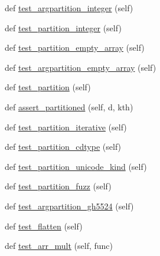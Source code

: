 \begin{DoxyCompactItemize}
\item 
def \hyperlink{classnumpy_1_1core_1_1tests_1_1test__multiarray_1_1TestMethods_aa68bb68efde92f1482c2d26bc1e85b8b}{test\+\_\+argpartition\+\_\+integer} (self)
\item 
def \hyperlink{classnumpy_1_1core_1_1tests_1_1test__multiarray_1_1TestMethods_a37b8921deb447074e1dec9799ff34883}{test\+\_\+partition\+\_\+integer} (self)
\item 
def \hyperlink{classnumpy_1_1core_1_1tests_1_1test__multiarray_1_1TestMethods_ad50732db5971f760aeb95fe0c21c85db}{test\+\_\+partition\+\_\+empty\+\_\+array} (self)
\item 
def \hyperlink{classnumpy_1_1core_1_1tests_1_1test__multiarray_1_1TestMethods_aec1ba85d37b378a1019f11eb7f627bf8}{test\+\_\+argpartition\+\_\+empty\+\_\+array} (self)
\item 
def \hyperlink{classnumpy_1_1core_1_1tests_1_1test__multiarray_1_1TestMethods_a39085484831a0c194f49c63c2cda34dd}{test\+\_\+partition} (self)
\item 
def \hyperlink{classnumpy_1_1core_1_1tests_1_1test__multiarray_1_1TestMethods_a59a49416d54d2ddc92a494b406583afb}{assert\+\_\+partitioned} (self, d, kth)
\item 
def \hyperlink{classnumpy_1_1core_1_1tests_1_1test__multiarray_1_1TestMethods_a79edc902ba6086fb2b3c3506d439b882}{test\+\_\+partition\+\_\+iterative} (self)
\item 
def \hyperlink{classnumpy_1_1core_1_1tests_1_1test__multiarray_1_1TestMethods_a9c4a39ba64f5394689e8175e864c5429}{test\+\_\+partition\+\_\+cdtype} (self)
\item 
def \hyperlink{classnumpy_1_1core_1_1tests_1_1test__multiarray_1_1TestMethods_a7f73f27eaaf3ce5ec7752cf29bc69d4c}{test\+\_\+partition\+\_\+unicode\+\_\+kind} (self)
\item 
def \hyperlink{classnumpy_1_1core_1_1tests_1_1test__multiarray_1_1TestMethods_a9d1e000c6ea0a2ce749827cfb28f0817}{test\+\_\+partition\+\_\+fuzz} (self)
\item 
def \hyperlink{classnumpy_1_1core_1_1tests_1_1test__multiarray_1_1TestMethods_a486ed2e8dec02fc879d00032e280e7d9}{test\+\_\+argpartition\+\_\+gh5524} (self)
\item 
def \hyperlink{classnumpy_1_1core_1_1tests_1_1test__multiarray_1_1TestMethods_ab3ac5bd7d82581b1fe09fecafd102e29}{test\+\_\+flatten} (self)
\item 
def \hyperlink{classnumpy_1_1core_1_1tests_1_1test__multiarray_1_1TestMethods_a57f5a3c907d6c312258bc3d9db32cbd5}{test\+\_\+arr\+\_\+mult} (self, func)

\end{DoxyCompactItemize}
